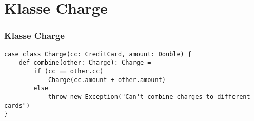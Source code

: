 	\section[Section]{Klasse Charge}
		\begin{frame}[fragile]
		\frametitle{Klasse Charge}
		\begin{lstlisting}[style=myScalastyle]
case class Charge(cc: CreditCard, amount: Double) {
	def combine(other: Charge): Charge =
		if (cc == other.cc)
			Charge(cc.amount + other.amount)
		else
			throw new Exception("Can't combine charges to different cards")
}
\end{lstlisting}
\end{frame}